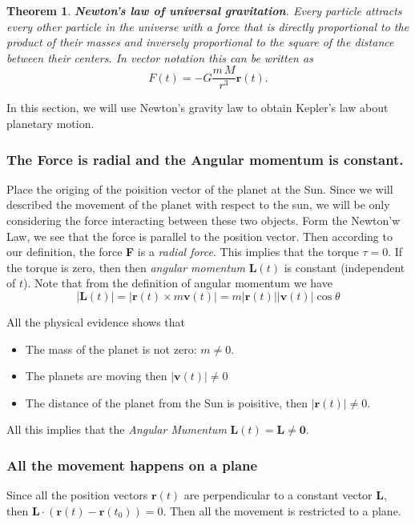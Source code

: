 \documentclass{amsart}
\newtheorem{thm}{Theorem}
\begin{document}
\begin{thm}
\textbf{Newton's law of universal gravitation}. Every particle attracts every other particle in the universe with a force that is directly proportional to the product of their masses and inversely proportional to the square of the distance between their centers. In vector notation this can be written as \[ F(t) = -G \frac{m \, M}{r^3} \mathbf{r}(t). \]
\end{thm}

In this section, we will use Newton's gravity law to obtain Kepler's law about planetary motion.


\subsubsection{The Force is radial and the Angular momentum is constant.}
\label{sec:orga608e87}

Place the origing of the poisition vector of the planet at the Sun. Since we will described the movement of the planet with respect to the sun, we will be only considering 
the force interacting between these two objects. Form the Newton'w Law, we see that the force is parallel to the position vector. Then according to our definition, the force
\textbf{F} is a \emph{radial force}. This implies that the torque \(\tau = 0\). If the torque is zero, then then \emph{angular momentum} \(\mathbf{L}(t)\) is constant (independent of \(t\)).
Note that from the definition of angular momentum we have
\[ |\mathbf{L}(t)| = |\mathbf{r}(t) \times m \mathbf{v}(t)| = m |\mathbf{r}(t)||\mathbf{v}(t)| \cos\theta \]

All the physical evidence shows that
\begin{itemize}
\item The mass of the planet is not zero: \(m\neq 0\).
\item The planets are moving then \(|\mathbf{v}(t)| \neq 0\)
\item The distance of the planet from the Sun is poisitive, then \(|\mathbf{r}(t)| \neq 0\).
\end{itemize}

All this implies that the \emph{Angular Mumentum} \(\mathbf{L}(t) = \mathbf{L} \neq \mathbf{0}\).

\subsubsection{All the movement happens on a plane}
\label{sec:orgcb95f75}

Since all the position vectors \(\mathbf{r}(t)\) are perpendicular to a constant vector \(\mathbf{L}\), then  \(\mathbf{L}\cdot \left(\mathbf{r}(t) - \mathbf{r}(t_0)\right) = 0\). Then all the movement is restricted to a plane.
\end{document}
